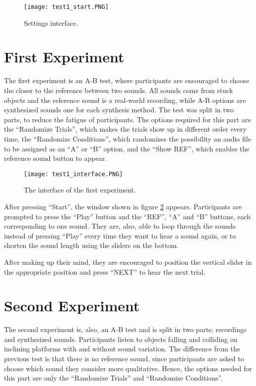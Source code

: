 \begin{figure}[H]
  \centering
    \texttt{[image: test1\_start.PNG]}
        \caption{Settings interface.}
        \label{fig:exp_start}
\end{figure}

\section*{First Experiment}
The first experiment is an A-B test, where participants are encouraged to choose the closer to the reference between two sounds. All sounds come from stuck objects and the reference sound is a real-world recording, while A-B options are synthesized sounds one for each synthesis method. The test was split in two parts, to reduce the fatigue of participants. The options required for this part are the ``Randomize Trials'', which makes the trials show up in different order every time, the ``Randomize Conditions'', which randomizes the possibility an audio file to be assigned as an ``A'' or ``B'' option, and the ``Show REF'', which enables the reference sound button to appear. 

\begin{figure}[H]
    \centering  
     \texttt{[image: test1\_interface.PNG]}
        \caption{The interface of the first experiment.}
        \label{fig:t1_ui}
\end{figure}

After pressing ``Start'', the window shown in figure \ref{fig:t1_ui} appears. Participants are prompted to press the ``Play'' button and the ``REF'', ``A'' and ``B'' buttons, each corresponding to one sound. They are, also, able to loop through the sounds instead of pressing ``Play'' every time they want to hear a sound again, or to shorten the sound length using the sliders on the bottom. 

After making up their mind, they are encouraged to position the vertical slider in the appropriate position and press ``NEXT'' to hear the next trial.

\section*{Second Experiment}
The second experiment is, also, an A-B test and is split in two parts; recordings and synthesized sounds. Participants listen to objects falling and colliding on inclining platforms with and without sound variation. The difference from the previous test is that there is no reference sound, since participants are asked to choose which sound they consider more qualitative. Hence, the options needed for this part are only the ``Randomize Trials'' and ``Randomize Conditions''.

